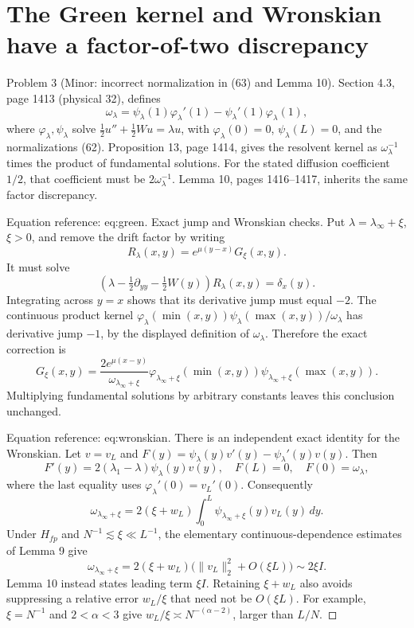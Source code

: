 \documentclass[10pt]{article}
\begin{document}
\section*{The Green kernel and Wronskian have a factor-of-two discrepancy}
Problem 3 (Minor: incorrect normalization in (63) and Lemma 10).  Section 4.3, page 1413 (physical 32), defines \[\omega_\lambda=
 \psi_\lambda(1)\varphi_\lambda'(1)
   -\psi_\lambda'(1)\varphi_\lambda(1),\] where \(\varphi_\lambda,\psi_\lambda\) solve \(\frac12u''+\frac12Wu=\lambda u\), with \(\varphi_\lambda(0)=0\), \(\psi_\lambda(L)=0\), and the normalizations (62). Proposition 13, page 1414, gives the resolvent kernel as \(\omega_\lambda^{-1}\) times the product of fundamental solutions. For the stated diffusion coefficient \(1/2\), that coefficient must be \(2\omega_\lambda^{-1}\). Lemma 10, pages 1416–1417, inherits the same factor discrepancy.\par
Equation reference: eq:green. Exact jump and Wronskian checks. Put \(\lambda=\lambda_\infty+\xi\), \(\xi>0\), and remove the drift factor by writing \[R_\lambda(x,y)=e^{\mu(y-x)}G_\xi(x,y).\] It must solve \[\left(\lambda-\tfrac12\partial_{yy}-\tfrac12W(y)\right)
 R_\lambda(x,y)=\delta_x(y).\] Integrating across \(y=x\) shows that its derivative jump must equal \(-2\). The continuous product kernel \(\varphi_\lambda(\min(x,y))\psi_\lambda(\max(x,y))/\omega_\lambda\) has derivative jump \(-1\), by the displayed definition of \(\omega_\lambda\). Therefore the exact correction is \[
 G_\xi(x,y)=\frac{2e^{\mu(x-y)}}{\omega_{\lambda_\infty+\xi}}
 \varphi_{\lambda_\infty+\xi}(\min(x,y))
 \psi_{\lambda_\infty+\xi}(\max(x,y)).\] Multiplying fundamental solutions by arbitrary constants leaves this conclusion unchanged.\par
Equation reference: eq:wronskian. There is an independent exact identity for the Wronskian. Let \(v=v_L\) and \(F(y)=\psi_\lambda(y)v'(y)-\psi_\lambda'(y)v(y)\). Then \[F'(y)=2(\lambda_1-\lambda)\psi_\lambda(y)v(y),\quad
 F(L)=0,\quad F(0)=\omega_\lambda,\] where the last equality uses \(\varphi_\lambda'(0)=v_L'(0)\). Consequently \[
 \omega_{\lambda_\infty+\xi}
   =2(\xi+w_L)\int_0^L\psi_{\lambda_\infty+\xi}(y)v_L(y)\,dy .\] Under \(H_{fp}\) and \(N^{-1}\lesssim\xi\ll L^{-1}\), the elementary continuous-dependence estimates of Lemma 9 give \[\omega_{\lambda_\infty+\xi}
 =2(\xi+w_L)\bigl(\|v_L\|_2^2+O(\xi L)\bigr)
 \sim 2\xi I .\] Lemma 10 instead states leading term \(\xi I\). Retaining \(\xi+w_L\) also avoids suppressing a relative error \(w_L/\xi\) that need not be \(O(\xi L)\). For example, \(\xi=N^{-1}\) and \(2<\alpha<3\) give \(w_L/\xi\asymp N^{-(\alpha-2)}\), larger than \(L/N\). ◻\par
\end{document}
